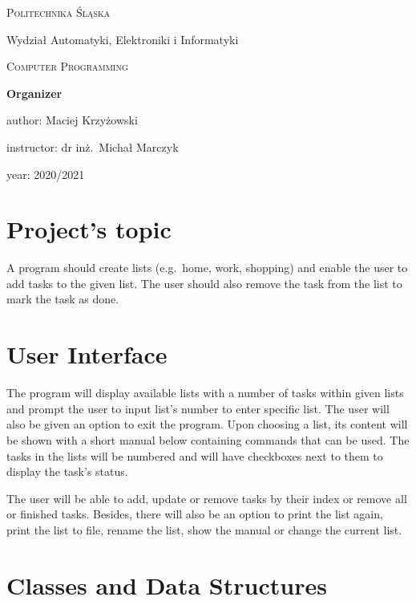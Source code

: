 \documentclass{article}
\begin{document}
\begin{titlepage}
	\centering
	{\scshape\LARGE Politechnika Śląska

    Wydział Automatyki, Elektroniki i Informatyki\par}
	\vspace{1cm}
	{\scshape\Large Computer Programming\par}
	\vspace{1.5cm}
	{\huge\bfseries Organizer\par}
	\vspace{2cm}
	\vfill
	author:
	Maciej Krzyżowski\par 
	instructor:
	dr inż.~Michał Marczyk\par
	year:
	2020/2021 

	\vfill

\end{titlepage}

\renewcommand*\contentsname{Summary}
\tableofcontents
\pagebreak

\section{Project’s topic}

A program should create lists (e.g.\ home, work, shopping) and enable the user to add tasks to the given list. The user should also remove the task from the list to mark the task as done.


\section{User Interface}

The program will display available lists with a number of tasks within given lists and prompt the user to input list's number to enter specific list. The user will also be given an option to exit the program. Upon choosing a list, its content will be shown with a short manual below containing commands that can be used. The tasks in the lists will be numbered and will have checkboxes next to them to display the task's status.

The user will be able to add, update or remove tasks by their index or remove all or finished tasks. Besides, there will also be an option to print the list again, print the list to file, rename the list, show the manual or change the current list.

\section{Classes and Data Structures}
\end{document}

